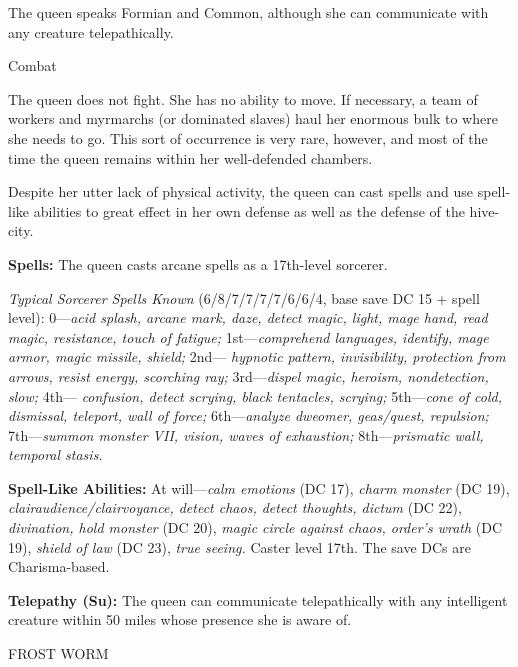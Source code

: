 \documentclass{article}
\begin{document}
The queen speaks Formian and Common, although she can communicate with any creature 
telepathically.

Combat

The queen does not fight. She has no ability to move. If necessary, a team of workers 
and myrmarchs (or dominated slaves) haul her enormous bulk to where she needs to 
go. This sort of occurrence is very rare, however, and most of the time the queen 
remains within her well-defended chambers.

Despite her utter lack of physical activity, the queen can cast spells and use 
spell-like abilities to great effect in her own defense as well as the defense 
of the hive-city.

\textbf{Spells:} The queen casts arcane spells as a 17th-level sorcerer.

\textit{Typical Sorcerer Spells Known }(6/8/7/7/7/7/6/6/4, base save DC 15 + spell 
level): 0---\textit{acid splash, arcane mark, daze, detect magic, light, mage hand, 
read magic, resistance, touch of fatigue; }1st---\textit{comprehend languages, 
identify, mage armor, magic missile, shield; }2nd--- \textit{hypnotic pattern, 
invisibility, protection from arrows, resist energy, scorching ray; }3rd---\textit{dispel 
magic, heroism, nondetection, slow; }4th--- \textit{confusion, detect scrying, 
black tentacles, scrying; }5th---\textit{cone of cold, dismissal, teleport, wall 
of force; }6th---\textit{analyze dweomer, geas/quest, repulsion; }7th---\textit{summon 
monster VII, vision, waves of exhaustion; }8th---\textit{prismatic wall, temporal 
stasis.}

\textbf{Spell-Like Abilities:} At will---\textit{calm emotions }(DC 17), \textit{charm 
monster }(DC 19), \textit{clairaudience/clairvoyance, detect chaos, detect thoughts, 
dictum }(DC 22), \textit{divination, hold monster }(DC 20), \textit{magic circle 
against chaos, order's wrath }(DC 19), \textit{shield of law }(DC 23), \textit{true 
seeing. }Caster level 17th. The save DCs are Charisma-based.

\textbf{Telepathy (Su):} The queen can communicate telepathically with any intelligent 
creature within 50 miles whose presence she is aware of.

\vspace{12pt}
{\LARGE{}FROST WORM}
\end{document}
